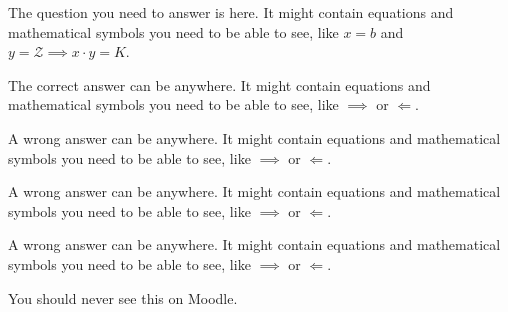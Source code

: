 \question[\mypoints] The question you need to answer is here.
It might contain equations and mathematical symbols you need to be able to see, like $x = b$ and $y=\mathcal{Z} \implies x\cdot y = K$.

\begin{mychoices}
  \CorrectChoice The correct answer can be anywhere.
  It might contain equations and mathematical symbols you need to be able to see, like $\implies$ or $\Longleftarrow$.
  
  \choice A wrong answer can be anywhere.
  It might contain equations and mathematical symbols you need to be able to see, like $\implies$ or $\Longleftarrow$.
  
  \choice A wrong answer can be anywhere.
  It might contain equations and mathematical symbols you need to be able to see, like $\implies$ or $\Longleftarrow$.
  
  \choice A wrong answer can be anywhere.
  It might contain equations and mathematical symbols you need to be able to see, like $\implies$ or $\Longleftarrow$.
\end{mychoices}

\begin{solutionorbox}
  You should never see this on Moodle.
\end{solutionorbox}